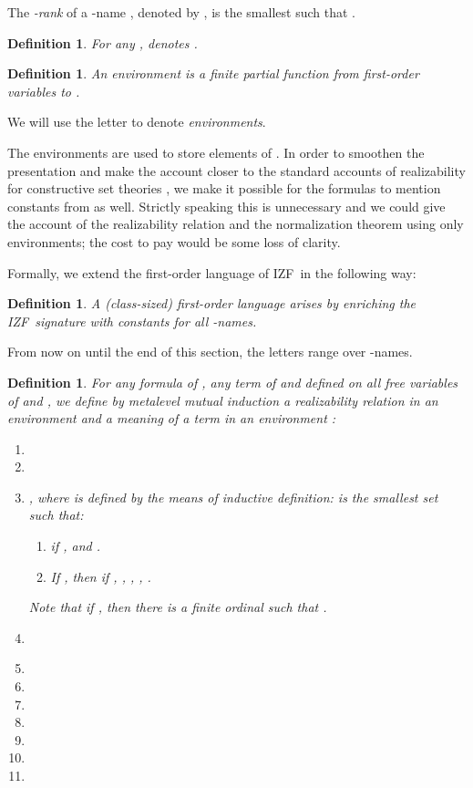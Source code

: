 \documentclass{LMCS}
\newtheorem{definition}[thm]{Definition}
\newcommand{\izfr}{IZF}
\begin{document}
The \emph{-rank} of a -name , denoted by , is the
smallest  such that .

\begin{definition}
For any ,  denotes . 
\end{definition}

\begin{definition}
An \emph{environment} is a finite partial function from first-order
variables to . 
\end{definition}
We will use the letter  to denote \emph{environments}.

The environments are used to store elements of . In order to smoothen the
presentation and make the account closer to the standard accounts of realizability for constructive set theories
\cite{mccarty,rathjendp,rathjenizf}, we make it possible for the formulas to mention constants 
from  as well. Strictly speaking this is unnecessary and we could give
the account of the realizability relation and the normalization theorem using
only environments; the cost to pay would be some loss of clarity.

Formally, we extend the first-order language of \izfr\ in the following way:

\begin{definition}
A (class-sized) first-order language  arises by enriching the \izfr\ signature
with constants for all -names.
\end{definition}

From now on until the end of this section, the letters  range over -names. 

\begin{definition}
For any formula  of , any term  of  and  defined on all free variables of
 and , we define by metalevel mutual induction a realizability relation  in an environment  and a meaning of a term  
 in an environment :
\begin{enumerate}[(1)]
\item 
\item 
\item \label{omegadef} , where  is defined by the means
of inductive definition:  is the smallest set such that:
\begin{enumerate}[]
\item  if ,  and . 
\item If , then  if , , , , . 
\end{enumerate}
Note that if , then there is a finite ordinal 
such that .
\item \label{termdef} 
\item 
\item 
\item 
\item 
\item 
\item 
\item 
\end{enumerate}
\end{definition}
\end{document}
